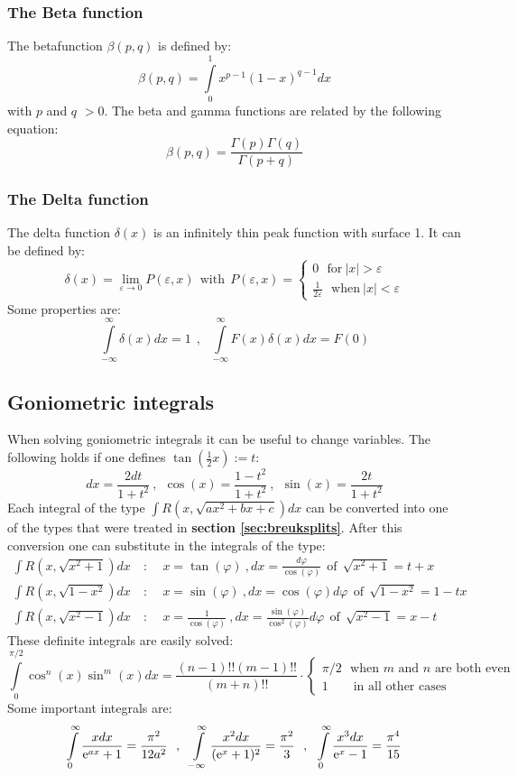 \documentclass[twoside]{report}
\begin{document}
\subsubsection{The Beta function}
The betafunction $\beta(p,q)$ is defined by:
\[
\beta(p,q)=\int\limits_0^1x^{p-1}(1-x)^{q-1}dx
\]
with $p$ and $q$ $>0$. The beta and gamma functions are related by the
following equation:
\[
\beta(p,q)=\frac{\Gamma(p)\Gamma(q)}{\Gamma(p+q)}
\]

\subsubsection{The Delta function}
The delta function $\delta(x)$ is an infinitely thin peak function with
surface 1. It can be defined by:
\[
\delta(x)=\lim_{\varepsilon\rightarrow0}P(\varepsilon,x)~~\mbox{with}~~
P(\varepsilon,x)=\left\{
\begin{array}{l}
0~~~\mbox{for}~|x|>\varepsilon\\
\displaystyle\frac{1}{2\varepsilon}~~~\mbox{when}~|x|<\varepsilon
\end{array}\right.
\]
Some properties are:
\[
\int\limits_{-\infty}^\infty\delta(x)dx=1~~,~~~
\int\limits_{-\infty}^\infty F(x)\delta(x)dx=F(0)
\]

\subsection{Goniometric integrals}
When solving goniometric integrals it can be useful to change variables. The
following holds if one defines $\tan(\frac{1}{2}x):=t$:
\[
dx=\frac{2dt}{1+t^2}~,~~\cos(x)=\frac{1-t^2}{1+t^2}~,~~\sin(x)=\frac{2t}{1+t^2}
\]
Each integral of the type $\int R(x,\sqrt{ax^2+bx+c})dx$ can be converted into
one of the types that were treated in {\bf section \ref{sec:breuksplits}}.
After this conversion one can substitute in the integrals of the type:
\begin{eqnarray*}
\int R(x,\sqrt{x^2+1})dx&~:~~&x=\tan(\varphi)          ~,dx=\frac{d\varphi}{\cos(\varphi)}               ~~\mbox{of}~~\sqrt{x^2+1}=t+x\\
\int R(x,\sqrt{1-x^2})dx&~:~~&x=\sin(\varphi)          ~,dx=\cos(\varphi)d\varphi                        ~~\mbox{of}~~\sqrt{1-x^2}=1-tx\\
\int R(x,\sqrt{x^2-1})dx&~:~~&x=\frac{1}{\cos(\varphi)}~,dx=\frac{\sin(\varphi)}{\cos^2(\varphi)}d\varphi~~\mbox{of}~~\sqrt{x^2-1}=x-t
\end{eqnarray*}
These definite integrals are easily solved:
\[
\int\limits_0^{\pi/2}\cos^n(x)\sin^m(x)dx=\frac{(n-1)!!(m-1)!!}{(m+n)!!}\cdot
\left\{\begin{array}{l}
\pi/2\mbox{~~when $m$ and $n$ are both even}\\
1\mbox{~~~~~~in all other cases}
\end{array}\right.
\]
Some important integrals are:
\[
\int\limits_0^\infty\frac{xdx}{{\rm e}^{ax}+1}=\frac{\pi^2}{12a^2}~~,~~
\int\limits_{-\infty}^\infty\frac{x^2dx}{({\rm e}^x+1)^2}=\frac{\pi^2}{3}~~,~~
\int\limits_0^\infty\frac{x^3dx}{{\rm e}^x-1}=\frac{\pi^4}{15}
\]
\end{document}
